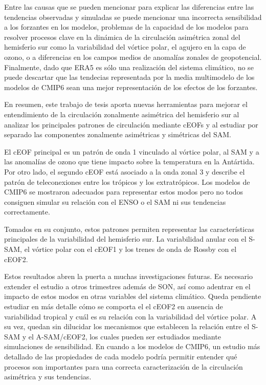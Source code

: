 \documentclass[12pt,oneside,a4paper]{reedthesis}
\begin{document}
Entre las causas que se pueden mencionar para explicar las diferencias entre las tendencias observadas y simuladas se puede mencionar una incorrecta sensibilidad a los forzantes en los modelos, problemas de la capacidad de los modelos para resolver procesos clave en la dinámica de la circulación asimétrica zonal del hemisferio sur como la variabilidad del vórtice polar, el agujero en la capa de ozono, o a diferencias en los campos medios de anomalías zonales de geopotencial.
Finalmente, dado que ERA5 es sólo una realización del sistema climático, no se puede descartar que las tendecias representada por la media multimodelo de los modelos de CMIP6 sean una mejor representación de los efectos de los forzantes.

En resumen, este trabajo de tesis aporta nuevas herramientas para mejorar el entendimiento de la circulación zonalmente asimétrica del hemisferio sur al analizar los principales patrones de circulación mediante cEOFs y al estudiar por separado las componentes zonalmente asimétricas y simétricas del SAM.

El cEOF principal es un patrón de onda 1 vinculado al vórtice polar, al SAM y a las anomalías de ozono que tiene impacto sobre la temperatura en la Antártida.
Por otro lado, el segundo cEOF está asociado a la onda zonal 3 y describe el patrón de teleconexiones entre los trópicos y los extratrópicos.
Los modelos de CMIP6 se mostraron adecuados para representar estos modos pero no todos consiguen simular su relación con el ENSO o el SAM ni sus tendencias correctamente.

Tomados en su conjunto, estos patrones permiten representar las características principales de la variabilidad del hemisferio sur.
La variabilidad anular con el S-SAM, el vórtice polar con el cEOF1 y los trenes de onda de Rossby con el cEOF2.

Estos resultados abren la puerta a muchas investigaciones futuras.
Es necesario extender el estudio a otros trimestres además de SON, así como adentrar en el impacto de estos modos en otras variables del sistema climático.
Queda pendiente estudiar en más detalle cómo se comporta el el cEOF2 en ausencia de variabilidad tropical y cuál es su relación con la variabilidad del vórtice polar.
A su vez, quedan sin dilucidar los mecanismos que establecen la relación entre el S-SAM y el A-SAM/cEOF2, los cuales pueden ser estudiados mediante simulaciones de sensibilidad.
En cuando a los modelos de CMIP6, un estudio más detallado de las propiedades de cada modelo podría permitir entender qué procesos son importantes para una correcta caracterización de la circulación asimétrica y sus tendencias.
\end{document}
